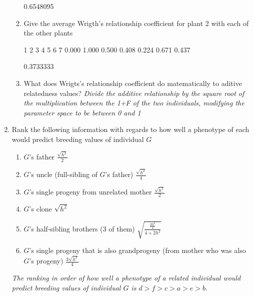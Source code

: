\documentclass[12pt,a4paper]{paper}
\begin{document}
\begin{enumerate}
\begin{enumerate}
\begin{Schunk}
\begin{Soutput}
\end{Soutput}
\begin{Soutput}
[1] 0.6548095
\end{Soutput}
\end{Schunk}
\item Give the average Wrigth's relationship coefficient for plant 2 with each of the other plants
\begin{Schunk}
\begin{Soutput}
    1     2     3     4     5     6     7 
0.000 1.000 0.500 0.408 0.224 0.671 0.437 
\end{Soutput}
\begin{Soutput}
[1] 0.3733333
\end{Soutput}
\end{Schunk}
\item What does Wrigts's relationship coefficient do matematically to aditive relatedness values?
\textit{Divide the additive relationship by the square root of the multiplication between the 1+F of the two individuals, modifying the parameter space to be between 0 and 1}
\end{enumerate}
\item Rank the following information with regards to how well a phenotype of each would predict breeding values of individual $G$
\begin{enumerate}
\item $G$'s father $\frac{\sqrt{h^{2}}}{2}$
\item $G$'s uncle (full-sibling of $G$'s father) $\frac{\sqrt{h^{2}}}{4}$
\item $G$'s single progeny from unrelated mother $\frac{\sqrt{h^{2}}}{2}$
\item $G$'s clone $\sqrt{h^{2}}$
\item $G$'s half-sibling brothers (3 of them) $\sqrt{\frac{\frac{3h^{2}}{4}}{4+2h^{2}}}$
\item $G$'s single progeny that is also grandprogeny (from mother who was also $G$'s progeny) $\frac{3\sqrt{h^{2}}}{4}$
\end{enumerate}
\textit{The ranking in order of how well a phenotype of a related individual would predict breeding values of individual $G$ is $d > f > c > a > e > b$}.
\end{enumerate}
\end{document}
